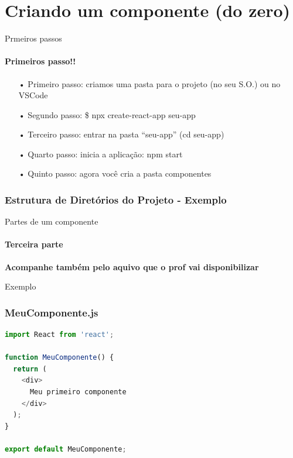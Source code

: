 \documentclass[13pt, xcolor={dvipsnames,svgnames}, portuguese]{beamer}
\begin{document}
\section{Criando um componente (do zero)}
\begin{frame}{Prmeiros passos}
\framesubtitle{Primeiros passo!!}
\begin{itemize}
	\item[•] Primeiro passo: criamos uma pasta para o projeto (no seu S.O.) ou no VSCode
	\pause
	\item[•] Segundo passo: \$ npx create-react-app seu-app
	\pause
	\item[•] Terceiro passo: entrar na pasta ``seu-app'' (cd seu-app)
	\pause
	\item[•] Quarto passo: inicia a aplicação: npm start
	\pause
	\item[•] Quinto passo: agora você cria a pasta componentes
\end{itemize}
\end{frame}




\begin{frame}
\frametitle{Estrutura de Diretórios do Projeto - Exemplo}
\end{frame}
\begin{frame}{Partes de um componente}
\framesubtitle{Terceira parte}

 \textbf{Acompanhe também pelo aquivo que o prof vai disponibilizar}

\end{frame}



\begin{frame}[fragile]{Exemplo}
\frametitle{MeuComponente.js}
\begin{lstlisting}[language=JavaScript]
import React from 'react';

function MeuComponente() {
  return (
    <div>
      Meu primeiro componente
    </div>
  );
}

export default MeuComponente;
\end{lstlisting}
\end{frame}


\end{document}
